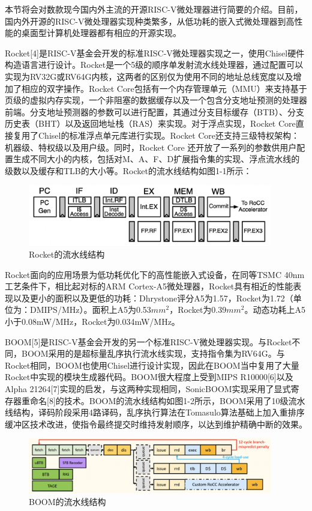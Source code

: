 本节将会对数款现今国内外主流的开源RISC-V微处理器进行简要的介绍。目前，国内外开源的RISC-V微处理器实现种类繁多，从低功耗的嵌入式微处理器到高性能的桌面型计算机处理器都有相应的开源实现。

Rocket[4]是RISC-V基金会开发的标准RISC-V微处理器实现之一，使用Chisel硬件构造语言进行设计。Rocket是一个5级的顺序单发射流水线处理器，通过配置可以实现为RV32G或RV64G内核，这两者的区别仅为使用不同的地址总线宽度以及增加了相应的双字操作。Rocket Core包括有一个内存管理单元（MMU）来支持基于页级的虚拟内存实现，一个非阻塞的数据缓存以及一个包含分支地址预测的处理器前端。分支地址预测器的参数可以进行配置，其通过分支目标缓存（BTB）、分支历史表（BHT）以及返回地址栈（RAS）来实现。对于浮点实现，Rocket Core直接复用了Chisel的标准浮点单元库进行实现。Rocket Core还支持三级特权架构：机器级、特权级以及用户级。同时，Rocket Core 还开放了一系列的参数供用户配置生成不同大小的内核，包括对M、A、F、D扩展指令集的实现、浮点流水线的级数以及缓存和TLB的大小等。Rocket的流水线结构如图1-1所示：

\begin{figure}[htbp]
	\centering
	\includegraphics[width=0.95\textwidth]{Photos/Rocket_Pipeline.png}
	\caption{Rocket的流水线结构}
\end{figure}

Rocket面向的应用场景为低功耗优化下的高性能嵌入式设备，在同等TSMC 40nm工艺条件下，相比起对标的ARM Cortex-A5微处理器，Rocket具有相近的性能表现以及更小的面积以及更低的功耗：Dhrystone评分A5为1.57，Rocket为1.72（单位为：DMIPS/MHz）。面积上A5为0.53$mm^2$，Rocket为0.39$mm^2$。动态功耗上A5小于0.08mW/MHz，Rocket为0.034mW/MHz。

BOOM[5]是RISC-V基金会开发的另一个标准RISC-V微处理器实现。与Rocket不同，BOOM采用的是超标量乱序执行流水线实现，支持指令集为RV64G。与Rocket相同，BOOM也使用Chisel进行设计实现，因此在BOOM当中复用了大量Rocket中实现的模块生成器代码。BOOM很大程度上受到MIPS R10000[6]以及Alpha 21264[7]实现的启发，与这两种实现相同，SonicBOOM实现采用了显式寄存器重命名[8]的技术。BOOM的流水线结构如图1-2所示，BOOM采用了10级流水线结构，译码阶段采用4路译码，乱序执行算法在Tomasulo算法基础上加入重排序缓冲区技术改进，使指令最终提交时维持发射顺序，以达到维护精确中断的效果。

\begin{figure}[htbp]
	\centering
	\includegraphics[width=0.95\textwidth]{Photos/BOOM_Pipeline.png}
	\caption{BOOM的流水线结构}
\end{figure}

